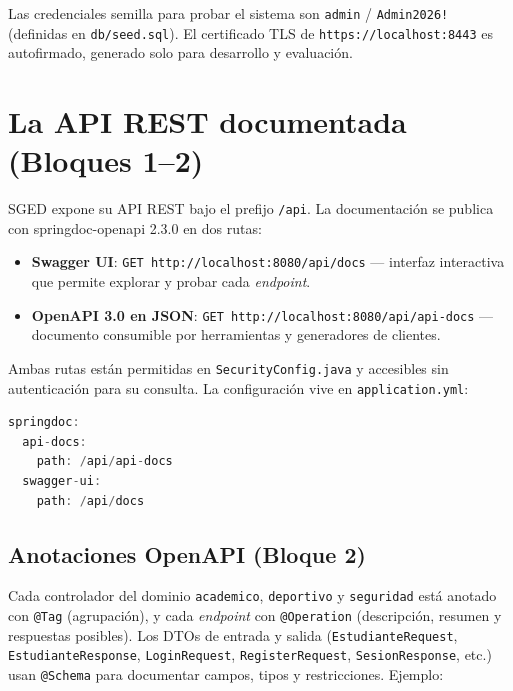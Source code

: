 \documentclass[11pt,a4paper]{article}
\newcommand{\ruta}[1]{\texttt{\footnotesize #1}}
\begin{document}
Las credenciales semilla para probar el sistema son \texttt{admin} /
\texttt{Admin2026!} (definidas en \ruta{db/seed.sql}). El certificado TLS de
\texttt{https://localhost:8443} es autofirmado, generado solo para desarrollo
y evaluación.

\section{La API REST documentada (Bloques 1--2)}

SGED expone su API REST bajo el prefijo \texttt{/api}. La documentación se
publica con springdoc-openapi 2.3.0 en dos rutas:

\begin{itemize}[leftmargin=*]
  \item \textbf{Swagger UI}: \texttt{GET http://localhost:8080/api/docs} ---
    interfaz interactiva que permite explorar y probar cada \emph{endpoint}.
  \item \textbf{OpenAPI 3.0 en JSON}: \texttt{GET
    http://localhost:8080/api/api-docs} --- documento consumible por
    herramientas y generadores de clientes.
\end{itemize}

Ambas rutas están permitidas en \ruta{SecurityConfig.java} y accesibles sin
autenticación para su consulta. La configuración vive en
\ruta{application.yml}:

\begin{lstlisting}[language=Java,caption={Rutas de la documentaci\'on (Bloque 1)}]
springdoc:
  api-docs:
    path: /api/api-docs
  swagger-ui:
    path: /api/docs
\end{lstlisting}

\subsection{Anotaciones OpenAPI (Bloque 2)}

Cada controlador del dominio \texttt{academico}, \texttt{deportivo} y
\texttt{seguridad} está anotado con \texttt{@Tag} (agrupación), y cada
\emph{endpoint} con \texttt{@Operation} (descripción, resumen y respuestas
posibles). Los DTOs de entrada y salida (\texttt{EstudianteRequest},
\texttt{EstudianteResponse}, \texttt{LoginRequest}, \texttt{RegisterRequest},
\texttt{SesionResponse}, etc.) usan \texttt{@Schema} para documentar campos,
tipos y restricciones. Ejemplo:
\end{document}
